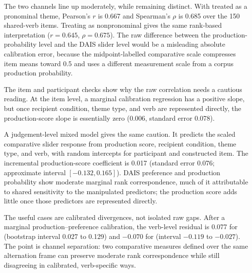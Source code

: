 The two channels line up moderately, while remaining distinct. With
 treated as a pronominal theme, Pearson's \(r\) is 0.667 and
Spearman's \(\rho\) is 0.685 over the 150 shared-verb items. Treating
 as nonpronominal gives the same rank-based interpretation
(\(r = 0.645\), \(\rho = 0.675\)). The raw difference between the
production-probability level and the DAIS slider level would be a misleading
absolute calibration error, because the midpoint-labelled comparative scale
compresses item means toward 0.5 and uses a different measurement scale from a
corpus production probability.

The item and participant checks show why the raw correlation needs a cautious
reading. At the item level, a marginal calibration regression has a positive
slope, but once recipient condition, theme type, and verb are represented
directly, the production-score slope is essentially zero (0.006, standard error
0.078).

A judgement-level mixed model gives the same caution. It predicts the scaled
comparative slider response from production score, recipient condition, theme
type, and verb, with random intercepts for participant and constructed item. The
incremental production-score coefficient is 0.017 (standard error 0.076;
approximate interval \([-0.132,0.165]\)). DAIS preference and production
probability show moderate marginal rank correspondence, much of it attributable
to shared sensitivity to the manipulated predictors; the production score adds
little once those predictors are represented directly.

The useful cases are calibrated divergences, not isolated raw gaps. After a
marginal production--preference calibration, the verb-level residual is 0.077
for  (bootstrap interval 0.027 to 0.129) and \(-0.070\) for
 (interval \(-0.119\) to \(-0.027\)). The point is channel
separation: two comparative measures defined over the same alternation frame
can preserve moderate rank correspondence while still disagreeing in
calibrated, verb-specific ways.
